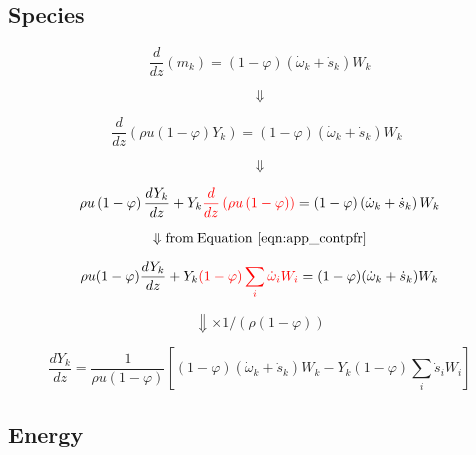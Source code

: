 \subsection{Species}

\begin{equation*}
	\frac{d}{dz}\left(m_k\right)=\left(1-\varphi\right)\left({\dot{\omega}}_k+{\dot{s}}_k\right)W_k
\end{equation*}

\begin{equation*}
	\Downarrow
\end{equation*}

\begin{equation*}
	\frac{d}{dz}\left(\rho u(1-\varphi)Y_k\right)=\left(1-\varphi\right)\left({\dot{\omega}}_k+{\dot{s}}_k\right)W_k\ \ 
\end{equation*}

\begin{equation*}
	\Downarrow
\end{equation*}

\begin{equation*}
	\rho u\left(1-\varphi\right)\frac{dY_k}{dz}
	+
	Y_k
	\color{red}
	\frac{d}{dz}\left(\rho u\left(1-\varphi\right)\right)
	\color{black}
	=
	\left(1-\varphi\right)\left({\dot{\omega}}_k+{\dot{s}}_k\right)W_k
\end{equation*}

\begin{equation*}
	\Downarrow \mathrm{from \: Equation~\eqref{eqn:app_contpfr}}
\end{equation*}

\begin{equation*}
	\rho u(1-\varphi)
	\frac{dY_k}{dz}
	+
	Y_k
	\color{red}
	(1-\varphi)\sum_{i}{{\dot{\omega}}_iW_i}
	\color{black}
	=
	(1-\varphi)({\dot{\omega}}_k+{\dot{s}}_k)W_k
\end{equation*}


\begin{equation*}
	\Downarrow \times 1/(\rho (1-\varphi))
\end{equation*}

\begin{equation}
	\frac{dY_k}{dz}=\frac{1}{\rho u(1-\varphi)}\left[(1-\varphi)({\dot{\omega}}_k+{\dot{s}}_k)W_k-Y_k(1-\varphi)\sum_{i}{{\dot{s}}_iW_i}\right]
	\label{eqn:app_speciespfr}
\end{equation}

\subsection{Energy}

